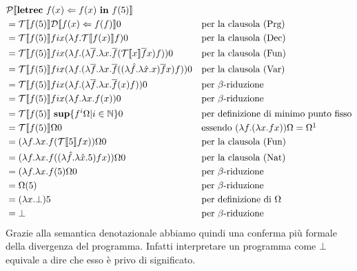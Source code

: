     \begin{align*}
        &\mathcal{P}\doublebracket{\mbox{\textbf{letrec}}\ f(x) \Leftarrow f(x)\ \mbox{\textbf{in}}\ f(5)} &&\\
        &= \mathcal{T}\doublebracket{ f(5)}\mathcal{D}\doublebracket{ f(x)\Leftarrow f(f)} 0 &&\mbox{per la clausola (Prg)}\\
        &= \mathcal{T}\doublebracket{ f(5)} fix(\lambda f.\mathcal{T}\doublebracket{ f(x)} f)0 &&\mbox{per la clausola (Dec)}\\
        &= \mathcal{T}\doublebracket{ f(5)} fix(\lambda f. (\lambda \overline{f}.\lambda x. \overline{f}(\mathcal{T}\doublebracket{ x}\overline{f}x)f))0 &&\mbox{per la clausola (Fun)}\\
        &= \mathcal{T}\doublebracket{ f(5)} fix(\lambda f. (\lambda \overline{f}.\lambda x. \overline{f}((\lambda\hat{f}.\lambda \hat{x}.x)\overline{f}x)f))0 &&\mbox{per la clausola (Var)}\\
        &= \mathcal{T}\doublebracket{ f(5)} fix(\lambda f. (\lambda \overline{f}.\lambda x. \overline{f}(x)f))0 &&\mbox{per $\beta$-riduzione}\\
        &= \mathcal{T}\doublebracket{ f(5)} fix(\lambda f.\lambda x.f(x))0 &&\mbox{per $\beta$-riduzione}\\
        &= \mathcal{T}\doublebracket{ f(5)}\ \mbox{\textbf{sup}}\{f^i\Omega |i\in\mathbb{N}\}0 &&\mbox{per definizione di minimo punto fisso}\\
        &= \mathcal{T}\doublebracket{ f(5)}\Omega 0 &&\mbox{essendo $(\lambda f.(\lambda x.fx))\Omega = \Omega$}\footnotemark\\
        &= (\lambda f.\lambda x. f(\mathcal{T}\doublebracket{ 5} fx))\Omega 0 &&\mbox{per la clausola (Fun)}\\
        &= (\lambda f.\lambda x. f((\lambda\hat{f}.\lambda\hat{x}.5) fx))\Omega 0 &&\mbox{per la clausola (Nat)}\\
        &= (\lambda f.\lambda x. f(5)\Omega 0 &&\mbox{per $\beta$-riduzione}\\
        &= \Omega(5) &&\mbox{per $\beta$-riduzione}\\
        &= (\lambda x.\bot)5 &&\mbox{per definizione di $\Omega$}\\
        &= \bot &&\mbox{per $\beta$-riduzione}
    \end{align*}
    Grazie alla semantica denotazionale abbiamo quindi una conferma più formale della divergenza del programma. Infatti interpretare un programma come $\bot$ equivale a dire che esso è privo di significato.
